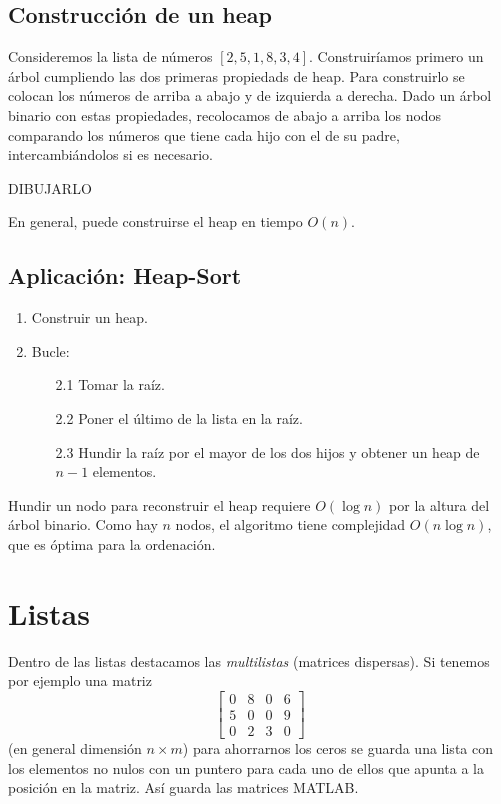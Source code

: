 \documentclass[AL.tex]{subfiles}
\begin{document}
\subsection{Construcción de un heap}
Consideremos la lista de números $[2,5,1,8,3,4]$.  Construiríamos primero un árbol cumpliendo las dos primeras propiedads de heap. Para construirlo se colocan los números de arriba a abajo y de izquierda a derecha.  Dado un árbol binario con estas propiedades, recolocamos de abajo a arriba los nodos comparando los números que tiene cada hijo con el de su padre, intercambiándolos si es necesario. 

DIBUJARLO

En general, puede construirse el heap en tiempo $O(n)$. 

\subsection{Aplicación: Heap-Sort}

\begin{enumerate}
\item Construir un heap.
\item Bucle: 
\begin{itemize}
\item[2.1] Tomar la raíz.
\item[2.2] Poner el último de la lista en la raíz.
\item[2.3] Hundir la raíz por el mayor de los dos hijos y obtener un heap de $n-1$ elementos. 
\end{itemize}
\end{enumerate}
Hundir un nodo para reconstruir el heap requiere $O(\log n)$ por la altura del árbol binario. Como hay $n$ nodos, el algoritmo tiene complejidad $O(n\log n)$, que es óptima para la ordenación. 





\section{Listas}

Dentro de las listas destacamos las \emph{multilistas} (matrices dispersas). Si tenemos por ejemplo una matriz $$\begin{bmatrix}
0 & 8 & 0 & 6\\
5 & 0 & 0 & 9\\
0 & 2 & 3 & 0
\end{bmatrix}$$
(en general dimensión $n\times m$) para ahorrarnos los ceros se guarda una lista con los elementos no nulos con un puntero para cada uno de ellos que apunta a la posición en la matriz. Así guarda las matrices MATLAB. 
\end{document}
